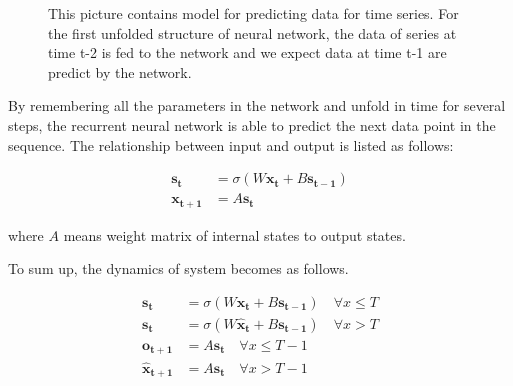 \documentclass[officiallayout]{tktla}
\begin{document}
\begin{figure}[h!]
  \caption{This picture contains model for predicting data for time series. For the first unfolded structure of neural network, the data of series at time t-2 is fed to the network and we expect data at time t-1 are predict by the network.}\label{series_prediction_rnn}
\end{figure}

By remembering all the parameters in the network and unfold in time for several steps, the recurrent neural network is able to predict the next data point in the sequence. The relationship between input and output is listed as follows:

\begin{align}
\mathbf{s_{t}} &= \sigma(W\mathbf{x_t} + B\mathbf{s_{t-1}}) \\
\mathbf{x_{t+1}} &= A\mathbf{s_{t}}
\end{align}

where $A$ means weight matrix of internal states to output states.


To sum up, the dynamics of system becomes as follows.

\begin{align}
\mathbf{s_{t}} &= \sigma(W\mathbf{x_t} + B\mathbf{s_{t-1}}) \quad \forall x \leq T \label{training_rnn}\\ 
\mathbf{s_{t}} &= \sigma(W\mathbf{\hat{x}_t} + B\mathbf{s_{t-1}}) \quad \forall x > T \label{prediction_rnn}\\
\mathbf{o_{t+1}} &= A\mathbf{s_{t}} \quad \forall x \leq T - 1 \label{train_output}\\
\mathbf{\hat{x}_{t+1}} &= A\mathbf{s_{t}}  \quad \forall x > T - 1  \label{train_prediction}
\end{align}
\end{document}
